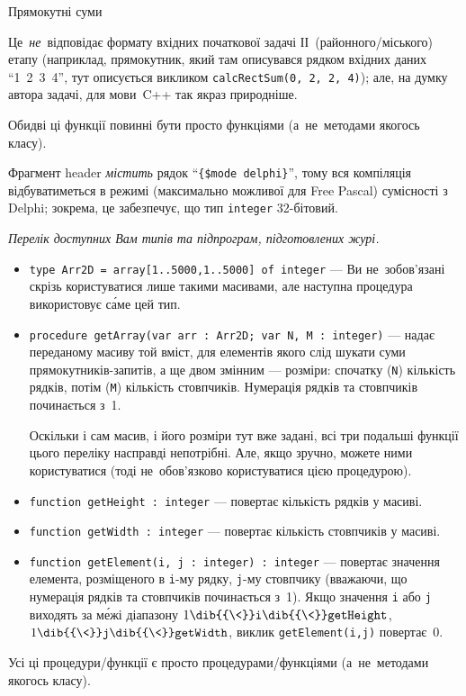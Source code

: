 \begin{problemAllDefault}{Прямокутні суми}
\begin{itemize}
Це~\emph{не}~відповідає формату вхідних початкової задачі ІІ~(районного/\nolinebreak[2]міського) етапу (наприклад, прямокутник, який там описувався рядком вхідних даних ``1~2~3~4'', тут описується викликом \texttt{calcRectSum(0,~2,~2,~4)}); але, на думку автора задачі, для мови~C++ так якраз природніше.

\end{itemize}
Обидві ці функції повинні бути просто функціями (а~не~методами якогось класу).

 Фрагмент header \emph{містить} рядок ``\verb"{$mode delphi}"'', тому вся компіляція відбуватиметься в режимі (максимально можливої для Free Pascal) сумісності з Delphi; зокрема, це забезпечує, що тип \texttt{integer} 32-бітовий.

\par\noindent\emph{Перелік доступних Вам типів та підпрограм, підготовлених журі.}

\begin{itemize}
\item
\texttt{type Arr2D = array[1..5000,1..5000] of integer} --- Ви не~зобов'язані скрізь користуватися лише такими масивами, але наступна процедура використовує с\'{а}ме цей тип.

\item
\texttt{procedure getArray(var arr : Arr2D; var N, M : integer)} --- надає переданому масиву той вміст, для елементів якого слід шукати суми прямокутників-запитів, а ще двом змінним --- розміри: спочатку (\texttt{N}) кількість рядків, потім (\texttt{M}) кількість стовпчиків. Нумерація рядків та стовпчиків починається з~1.

Оскільки і сам масив, і його розміри тут вже задані, всі три подальші функції цього переліку насправді непотрібні. Але, якщо зручно, можете ними користуватися (тоді не~обов'язково користуватися цією процедурою).

\item
\texttt{function getHeight : integer} --- повертає кількість рядків у масиві.

\item
\texttt{function getWidth : integer} --- повертає кількість стовпчиків у масиві.

\item
\texttt{function getElement(i,~j : integer) : integer} --- повертає значення елемента, розміщеного в \texttt{i}-му рядку, \texttt{j}-му стовпчику (вважаючи, що нумерація рядків та стовпчиків починається з~1). Якщо значення \texttt{i} або \texttt{j} виходять за м\'{е}жі діапазону 
$1\dib{{\<}}\texttt{i}\dib{{\<}}\texttt{getHeight}$,
$1\dib{{\<}}\texttt{j}\dib{{\<}}\texttt{getWidth}$,
виклик \texttt{getElement(i,j)} повертає~0.
\end{itemize}
Усі ці процедури/\nolinebreak[2]функції є просто процедурами/\nolinebreak[2]функціями (а~не~методами якогось класу).


\end{problemAllDefault}
